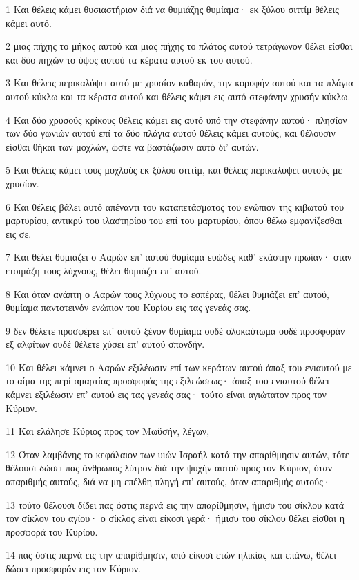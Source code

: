 \par 1 Και θέλεις κάμει θυσιαστήριον διά να θυμιάζης θυμίαμα· εκ ξύλου σιττίμ θέλεις κάμει αυτό.
\par 2 μιας πήχης το μήκος αυτού και μιας πήχης το πλάτος αυτού τετράγωνον θέλει είσθαι και δύο πηχών το ύψος αυτού τα κέρατα αυτού εκ του αυτού.
\par 3 Και θέλεις περικαλύψει αυτό με χρυσίον καθαρόν, την κορυφήν αυτού και τα πλάγια αυτού κύκλω και τα κέρατα αυτού και θέλεις κάμει εις αυτό στεφάνην χρυσήν κύκλω.
\par 4 Και δύο χρυσούς κρίκους θέλεις κάμει εις αυτό υπό την στεφάνην αυτού· πλησίον των δύο γωνιών αυτού επί τα δύο πλάγια αυτού θέλεις κάμει αυτούς, και θέλουσιν είσθαι θήκαι των μοχλών, ώστε να βαστάζωσιν αυτό δι' αυτών.
\par 5 Και θέλεις κάμει τους μοχλούς εκ ξύλου σιττίμ, και θέλεις περικαλύψει αυτούς με χρυσίον.
\par 6 Και θέλεις βάλει αυτό απέναντι του καταπετάσματος του ενώπιον της κιβωτού του μαρτυρίου, αντικρύ του ιλαστηρίου του επί του μαρτυρίου, όπου θέλω εμφανίζεσθαι εις σε.
\par 7 Και θέλει θυμιάζει ο Ααρών επ' αυτού θυμίαμα ευώδες καθ' εκάστην πρωΐαν· όταν ετοιμάζη τους λύχνους, θέλει θυμιάζει επ' αυτού.
\par 8 Και όταν ανάπτη ο Ααρών τους λύχνους το εσπέρας, θέλει θυμιάζει επ' αυτού, θυμίαμα παντοτεινόν ενώπιον του Κυρίου εις τας γενεάς σας.
\par 9 δεν θέλετε προσφέρει επ' αυτού ξένον θυμίαμα ουδέ ολοκαύτωμα ουδέ προσφοράν εξ αλφίτων ουδέ θέλετε χύσει επ' αυτού σπονδήν.
\par 10 Και θέλει κάμνει ο Ααρών εξιλέωσιν επί των κεράτων αυτού άπαξ του ενιαυτού με το αίμα της περί αμαρτίας προσφοράς της εξιλεώσεως· άπαξ του ενιαυτού θέλει κάμνει εξιλέωσιν επ' αυτού εις τας γενεάς σας· τούτο είναι αγιώτατον προς τον Κύριον.
\par 11 Και ελάλησε Κύριος προς τον Μωϋσήν, λέγων,
\par 12 Όταν λαμβάνης το κεφάλαιον των υιών Ισραήλ κατά την απαρίθμησιν αυτών, τότε θέλουσι δώσει πας άνθρωπος λύτρον διά την ψυχήν αυτού προς τον Κύριον, όταν απαριθμής αυτούς, διά να μη επέλθη πληγή επ' αυτούς, όταν απαριθμής αυτούς·
\par 13 τούτο θέλουσι δίδει πας όστις περνά εις την απαρίθμησιν, ήμισυ του σίκλου κατά τον σίκλον του αγίου· ο σίκλος είναι είκοσι γερά· ήμισυ του σίκλου θέλει είσθαι η προσφορά του Κυρίου.
\par 14 πας όστις περνά εις την απαρίθμησιν, από είκοσι ετών ηλικίας και επάνω, θέλει δώσει προσφοράν εις τον Κύριον.
